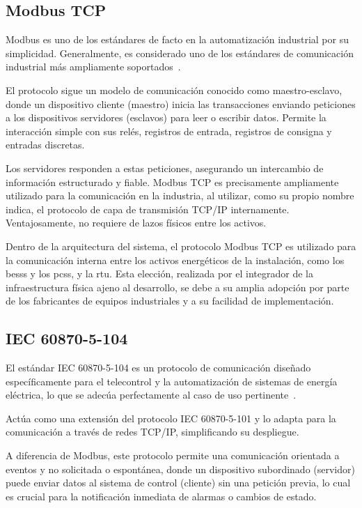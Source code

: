 \subsection{Modbus TCP}%
\label{makereference3.3.1}

Modbus es uno de los estándares de facto en la automatización industrial por su simplicidad. Generalmente, es considerado uno de los estándares de comunicación industrial más ampliamente soportados~\cite{swales1999open}.

El protocolo sigue un modelo de comunicación conocido como maestro-esclavo, donde un dispositivo cliente (maestro) inicia las transacciones enviando peticiones a los dispositivos servidores (esclavos) para leer o escribir datos. Permite la interacción simple con sus relés, registros de entrada, registros de consigna y entradas discretas.

Los servidores responden a estas peticiones, asegurando un intercambio de información estructurado y fiable. Modbus TCP es precisamente ampliamente utilizado para la comunicación en la industria, al utilizar, como su propio nombre indica, el protocolo de capa de transmisión TCP/IP internamente. Ventajosamente, no requiere de lazos físicos entre los activos.

Dentro de la arquitectura del sistema, el protocolo Modbus TCP es utilizado para la comunicación interna entre los activos energéticos de la instalación, como los \glspl{bess} y los \glspl{pcs}, y la \gls{rtu}. Esta elección, realizada por el integrador de la infraestructura física ajeno al desarrollo, se debe a su amplia adopción por parte de los fabricantes de equipos industriales y a su facilidad de implementación.

\subsection{IEC 60870{-}5{-}104}%
\label{makereference3.3.2}

El estándar IEC 60870{-}5{-}104 es un protocolo de comunicación diseñado específicamente para el telecontrol y la automatización de sistemas de energía eléctrica, lo que se adecúa perfectamente al caso de uso pertinente~\cite{iec2016telecontrol}.

Actúa como una extensión del protocolo IEC 60870{-}5{-}101 y lo adapta para la comunicación a través de redes TCP/IP, simplificando su despliegue.

A diferencia de Modbus, este protocolo permite una comunicación orientada a eventos y no solicitada o espontánea, donde un dispositivo subordinado (servidor) puede enviar datos al sistema de control (cliente) sin una petición previa, lo cual es crucial para la notificación inmediata de alarmas o cambios de estado.

